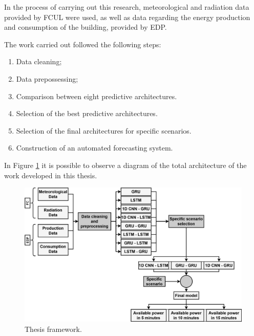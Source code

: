 In the process of carrying out this research, meteorological and radiation data provided by \ac{FCUL} were used, as well as data regarding the energy production and consumption of the building, provided by \ac{EDP}.

The work carried out followed the following steps:
\begin{enumerate}[noitemsep,topsep=0pt]
  \itemsep0em 
  \item Data cleaning;
  \item Data prepossessing;
  \item Comparison between eight predictive architectures.
  \item Selection of the best predictive architectures.
  \item Selection of the final architectures for specific scenarios.
  \item Construction of an automated forecasting system.
\end{enumerate}


In Figure \ref{scope} it is possible to observe a diagram of the total architecture of the work developed in this thesis. 

\begin{figure}[h!]
    \centering
    \begin{center}
    \includegraphics[width=1\textwidth]{Images/Work.png}
    \caption{Thesis framework.}
    \label{scope}
    \end{center}
\end{figure}

